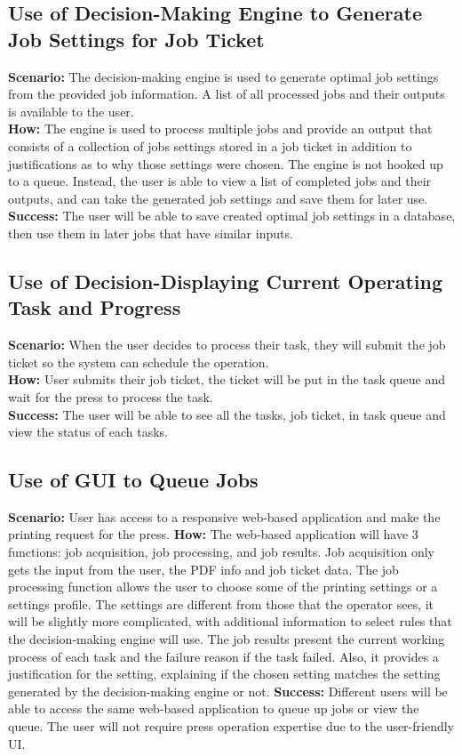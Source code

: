 \documentclass[onecolumn, draftclsnofoot,10pt, compsoc]{IEEEtran}
\begin{document}
\subsection{Use of Decision-Making Engine to Generate Job Settings for Job Ticket}
\textbf{Scenario:} The decision-making engine is used to generate optimal job settings from the provided job information. A list of all processed jobs and their outputs is available to the user.\\
\textbf{How:} The engine is used to process multiple jobs and provide an output that consists of a collection of jobs settings stored in a job ticket in addition to justifications as to why those settings were chosen. The engine is not hooked up to a queue. Instead, the user is able to view a list of completed jobs and their outputs, and can take the generated job settings and save them for later use.\\
\textbf{Success:} The user will be able to save created optimal job settings in a database, then use them in later jobs that have similar inputs.

\subsection{Use of Decision-Displaying Current Operating Task and Progress }
\textbf{Scenario:} When the user decides to process their task, they will submit the job ticket so the system can schedule the operation.\\
\textbf{How:} User submits their job ticket, the ticket will be put in the task queue and wait for the press to process the task.\\
\textbf{Success:} The user will be able to see all the tasks, job ticket, in task queue and view the status of each tasks.

\subsection{Use of GUI to Queue Jobs}
\textbf{Scenario:} User has access to a responsive web-based application and make the printing request for the press.\newline
\textbf{How:} The web-based application will have 3 functions: job acquisition, job processing, and job results. Job acquisition only gets the input from the user, the PDF info and job ticket data. The job processing function allows the user to choose some of the printing settings or a settings profile. The settings are different from those that the operator sees, it will be slightly more complicated, with additional information to select rules that the decision-making engine will use. The job results present the current working process of each task and the failure reason if the task failed. Also, it provides a justification for the setting, explaining if the chosen setting matches the setting generated by the decision-making engine or not. \newline
\textbf{Success:} Different users will be able to access the same web-based application to queue up jobs or view the queue. The user will not require press operation expertise due to the user-friendly UI.
\end{document}
